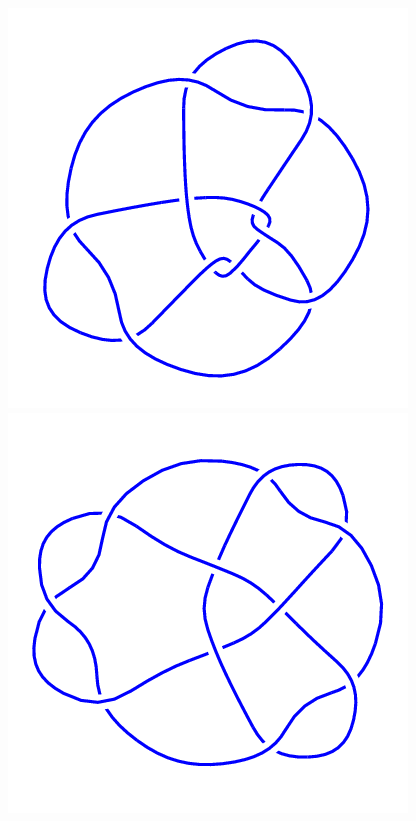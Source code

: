 \begin{figure}[H]
\begin{minipage}[b]{.18\linewidth}
    \end{minipage}
    \begin{minipage}[b]{.18\linewidth}
        \centering
        \includegraphics[width=\linewidth]{../data/10_99.png}
    \end{minipage}
    \begin{minipage}[b]{.18\linewidth}
        \centering
        \includegraphics[width=\linewidth]{../data/10_100.png}

\end{minipage}
\end{figure}

